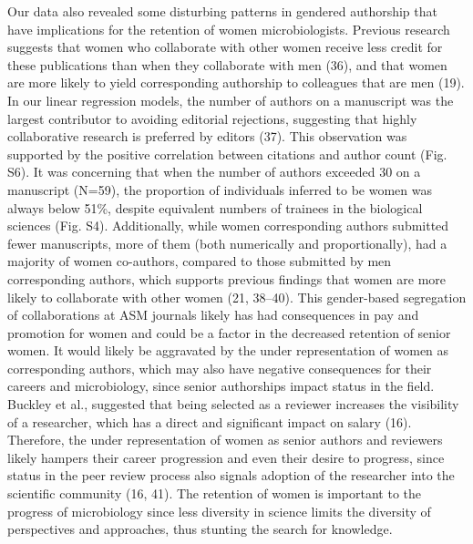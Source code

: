 \documentclass[11pt,]{article}
\begin{document}
Our data also revealed some disturbing patterns in gendered authorship
that have implications for the retention of women microbiologists.
Previous research suggests that women who collaborate with other women
receive less credit for these publications than when they collaborate
with men (36), and that women are more likely to yield corresponding
authorship to colleagues that are men (19). In our linear regression
models, the number of authors on a manuscript was the largest
contributor to avoiding editorial rejections, suggesting that highly
collaborative research is preferred by editors (37). This observation
was supported by the positive correlation between citations and author
count (Fig. S6). It was concerning that when the number of authors
exceeded 30 on a manuscript (N=59), the proportion of individuals
inferred to be women was always below 51\%, despite equivalent numbers
of trainees in the biological sciences (Fig. S4). Additionally, while
women corresponding authors submitted fewer manuscripts, more of them
(both numerically and proportionally), had a majority of women
co-authors, compared to those submitted by men corresponding authors,
which supports previous findings that women are more likely to
collaborate with other women (21, 38--40). This gender-based segregation
of collaborations at ASM journals likely has had consequences in pay and
promotion for women and could be a factor in the decreased retention of
senior women. It would likely be aggravated by the under representation
of women as corresponding authors, which may also have negative
consequences for their careers and microbiology, since senior
authorships impact status in the field. Buckley et al., suggested that
being selected as a reviewer increases the visibility of a researcher,
which has a direct and significant impact on salary (16). Therefore, the
under representation of women as senior authors and reviewers likely
hampers their career progression and even their desire to progress,
since status in the peer review process also signals adoption of the
researcher into the scientific community (16, 41). The retention of
women is important to the progress of microbiology since less diversity
in science limits the diversity of perspectives and approaches, thus
stunting the search for knowledge.
\end{document}
